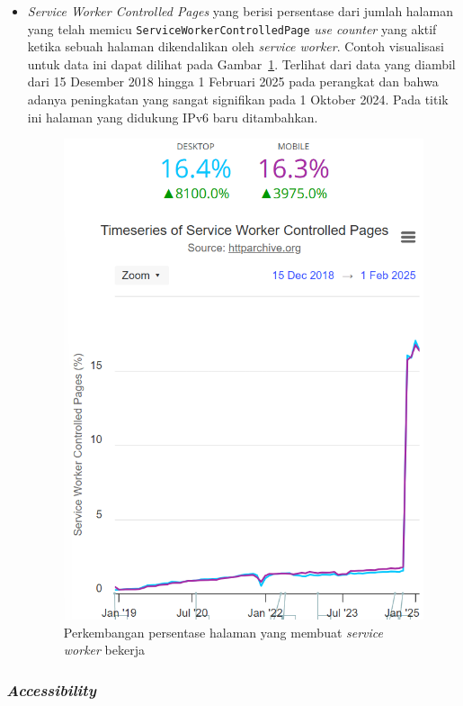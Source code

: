 \begin{itemize}
    \item \textit{Service Worker Controlled Pages} yang berisi persentase dari jumlah halaman yang telah memicu \verb|ServiceWorkerControlledPage| \textit{use counter} yang aktif ketika sebuah halaman \web dikendalikan oleh \textit{service worker}. Contoh visualisasi untuk data ini dapat dilihat pada Gambar~\ref{fig:serverworker}. Terlihat dari data yang diambil dari 15 Desember 2018 hingga 1 Februari 2025 pada perangkat \desktop dan \mobile bahwa adanya peningkatan yang sangat signifikan pada 1 Oktober 2024. Pada titik ini halaman \web yang didukung IPv6 baru ditambahkan. 
    \begin{figure}[H]
        \centering
        \includegraphics[width=0.4\linewidth]{Gambar/Contoh Service Worker.png}
        \caption{Perkembangan persentase halaman yang membuat \textit{service worker} bekerja}
        \label{fig:serverworker}
    \end{figure}
\end{itemize}


\subsubsection{\textit{Accessibility}}
\label{subsub:access}

